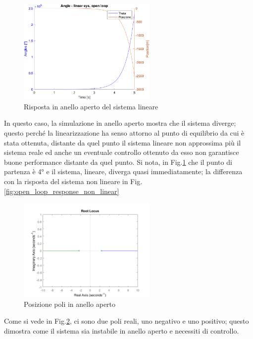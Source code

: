 \begin{figure}[H]
	\centering   	
	\includegraphics[width=0.6\textwidth]{Immagini/linear_open_loop.png}
	\caption{Risposta in anello aperto del sistema lineare}
	\label{fig:open_loop_response}
\end{figure}
In questo caso, la simulazione in anello aperto mostra che il sistema diverge; questo perché la linearizzazione ha senso attorno al punto di equilibrio da cui è stata ottenuta, distante da quel punto il sistema lineare non approssima più il sistema reale ed anche un eventuale controllo ottenuto da esso non garantisce buone performance distante da quel punto. Si nota, in Fig.\ref{fig:open_loop_response} che il punto di partenza è 4° e il sistema, lineare, diverga quasi immediatamente; la differenza con la risposta del sistema non lineare in Fig.\ref{fig:open_loop_response_non_linear}
\begin{figure}[H]
	\centering   	
	\includegraphics[width=0.6\textwidth]{Immagini/root_locus_open_loop.png}
	\caption{Posizione poli in anello aperto}
	\label{fig:open_loop_root}
\end{figure}
Come si vede in Fig.\ref{fig:open_loop_root}, ci sono due poli reali, uno negativo e uno positivo; questo dimostra come il sistema sia instabile in anello aperto e necessiti di controllo.


